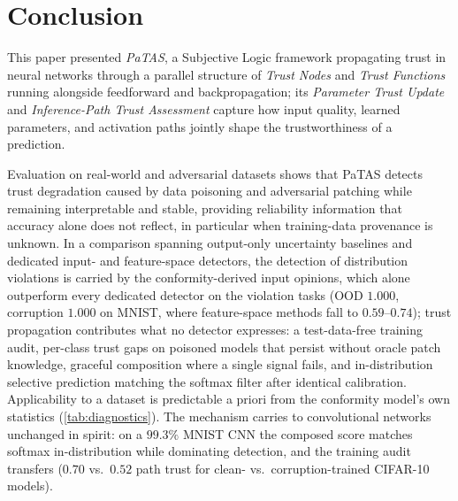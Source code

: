 \vspace{-0.5em}
\section{Conclusion}\label{sec:conclusion}
This paper presented \emph{PaTAS}, a Subjective Logic framework propagating trust in neural networks through a parallel structure of \emph{Trust Nodes} and \emph{Trust Functions} running alongside feedforward and backpropagation; its \emph{Parameter Trust Update} and \emph{Inference-Path Trust Assessment} capture how input quality, learned parameters, and activation paths jointly shape the trustworthiness of a prediction.

Evaluation on real-world and adversarial datasets shows that PaTAS detects trust degradation caused by data poisoning and adversarial patching while remaining interpretable and stable, providing reliability information that accuracy alone does not reflect, in particular when training-data provenance is unknown. In a comparison spanning output-only uncertainty baselines and dedicated input- and feature-space detectors, the detection of distribution violations is carried by the conformity-derived input opinions, which alone outperform every dedicated detector on the violation tasks (OOD $1.000$, corruption $1.000$ on MNIST, where feature-space methods fall to $0.59$--$0.74$); trust propagation contributes what no detector expresses: a test-data-free training audit, per-class trust gaps on poisoned models that persist without oracle patch knowledge, graceful composition where a single signal fails, and in-distribution selective prediction matching the softmax filter after identical calibration. Applicability to a dataset is predictable a priori from the conformity model's own statistics (\cref{tab:diagnostics}). The mechanism carries to convolutional networks unchanged in spirit: on a $99.3\%$ MNIST CNN the composed score matches softmax in-distribution while dominating detection, and the training audit transfers ($0.70$ vs.\ $0.52$ path trust for clean- vs.\ corruption-trained CIFAR-10 models).

